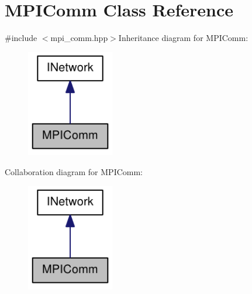 \hypertarget{class_m_p_i_comm}{
\section{MPIComm Class Reference}
\label{class_m_p_i_comm}
}


{\ttfamily \#include $<$mpi\_\-comm.hpp$>$}Inheritance diagram for MPIComm:\nopagebreak
\begin{figure}[H]
\begin{center}
\leavevmode
\includegraphics[width=108pt]{class_m_p_i_comm__inherit__graph}
\end{center}
\end{figure}
Collaboration diagram for MPIComm:\nopagebreak
\begin{figure}[H]
\begin{center}
\leavevmode
\includegraphics[width=108pt]{class_m_p_i_comm__coll__graph}
\end{center}
\end{figure}
